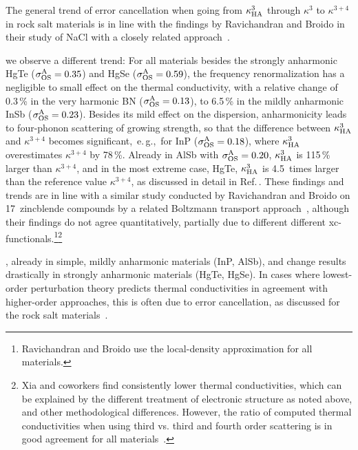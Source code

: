The general trend of error cancellation when going from $\kappa^3_{\rm HA}$ through $\kappa^{3}$ to $\kappa^{3+4}$ in rock salt materials is in line with the findings by Ravichandran and Broido in their study of NaCl with a closely related approach~\cite{Ravichandran.2018}.

 we observe a different trend: For all materials besides the strongly anharmonic HgTe ($\sigma^\mathrm{A}_\mathrm{OS} = 0.35$) and HgSe ($\sigma^\mathrm{A}_\mathrm{OS} = 0.59$), the frequency renormalization has a negligible to small effect on the thermal conductivity, with a relative change of 0.3\,\% in the very harmonic BN ($\sigma^\mathrm{A}_\mathrm{OS} = 0.13$), to 6.5\,\% in the mildly anharmonic InSb ($\sigma^\mathrm{A}_\mathrm{OS} = 0.23$). Besides its mild effect on the dispersion, anharmonicity leads to four-phonon scattering of growing strength, so that the difference between $\kappa^3_{\rm HA}$ and $\kappa^{3+4}$ becomes significant,~e.\,g.,~for InP ($\sigma^\mathrm{A}_\mathrm{OS} = 0.18$), where $\kappa^3_{\rm HA}$ overestimates $\kappa^{3+4}$ by 78\,\%. Already in AlSb with $\sigma^\mathrm{A}_\mathrm{OS} = 0.20$, $\kappa^3_{\rm HA}$ is 115\,\% larger than $\kappa^{3+4}$, and in the most extreme case, HgTe, $\kappa^3_{\rm HA}$ is 4.5~times larger than the reference value $\kappa^{3+4}$, as discussed in detail in Ref.\,\cite{Xia.2020}.
These findings and trends are in line with a similar study conducted by Ravichandran and Broido on 17~zincblende compounds by a related Boltzmann transport approach~\cite{Ravichandran.2020}, although their findings do not agree quantitatively, partially due to different different xc-functionals.\footnote{Ravichandran and Broido use the local-density approximation for all materials.}\footnote{
  Xia and coworkers find consistently lower thermal conductivities, which can be explained by the different treatment of electronic structure as noted above, and other methodological differences. However, the ratio of computed thermal conductivities when using third vs. third and fourth order scattering is in good agreement for all materials~\cite{Xia.2020,Ravichandran.2020}.}
  
  , already in simple, mildly anharmonic materials (InP, AlSb), and change results drastically in strongly anharmonic materials (HgTe, HgSe). In cases where lowest-order perturbation theory predicts thermal conductivities in agreement with higher-order approaches, this is often due to error cancellation, as discussed for the rock salt materials~\cite{Ravichandran.2018}.

